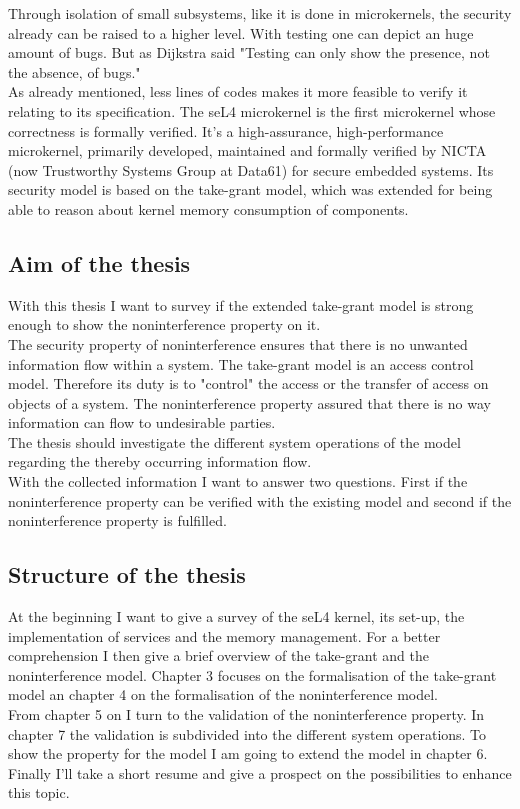 Through isolation of small subsystems, like it is done in microkernels, the security already can be raised to a higher level. With testing one can depict an huge amount of bugs. But as Dijkstra said "Testing can only show the presence, not the absence, of bugs." \cite{EngTec} \\
As already mentioned, less lines of codes makes it more feasible to verify it relating to its specification. 
The seL4 microkernel is the first microkernel whose correctness is formally verified. It's a high-assurance, high-performance microkernel, primarily developed, maintained and formally verified by NICTA (now Trustworthy Systems Group at Data61) for secure embedded systems. Its security model is based on the take-grant model, which was extended for being able to reason about kernel memory consumption of components. 
	\subsection{Aim of the thesis}
	With this thesis I want to survey if the extended take-grant model is strong enough to show the noninterference property on it. \\
	The security property of noninterference ensures that there is no unwanted information flow within a system. The take-grant model is an access control model. Therefore its duty is to "control" the access or the transfer of access on objects of a system. The noninterference property assured that there is no way information can flow to undesirable parties. \\
The thesis should investigate the different system operations of the model regarding the thereby occurring information flow. \\
With the collected information I want to answer two questions. First if the noninterference property can be verified with the existing model and second if the noninterference property is fulfilled. 
\subsection{Structure of the thesis}
At the beginning I want to give a survey of the seL4 kernel, its set-up, the implementation of services and the memory management. For a better comprehension I then give a brief overview of the take-grant and the noninterference model. 
Chapter 3 focuses on the formalisation of the take-grant model an chapter 4 on the formalisation of the noninterference model. \\
From chapter 5 on I turn to the validation of the noninterference property. In chapter 7 the validation is subdivided into the different system operations. To show the property for the model I am going to extend the model in chapter 6. \\
Finally I'll take a short resume and give a prospect on the possibilities to enhance this topic.